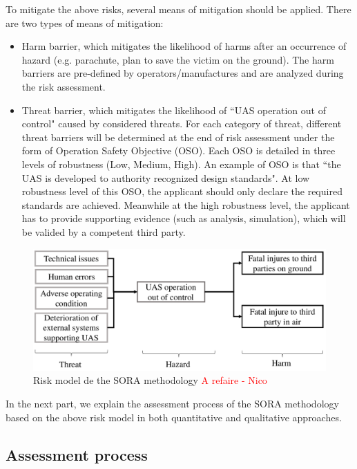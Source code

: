 \documentclass[a4paper, 10, conference]{ieeeconf}  %
\begin{document}
 To mitigate the above risks, several means of mitigation should be applied. There are two types of means of mitigation: 
\begin{itemize}
	\item Harm barrier, which mitigates the likelihood of harms after an occurrence of hazard (e.g. parachute, plan to save the victim on the ground). The harm barriers are pre-defined by operators/manufactures and are analyzed during the risk assessment. 
	\item Threat barrier, which mitigates the likelihood of ``UAS operation out of control" caused by considered threats. For each category of threat, different threat barriers will be determined at the end of risk assessment under the form of Operation Safety Objective (OSO). Each OSO is detailed in three levels of robustness (Low, Medium, High). An example of OSO is that ``the UAS is developed to authority recognized design standards"\cite{Annex_E_SORA}. At low robustness level  of this OSO, the applicant should only declare the required standards are achieved. Meanwhile at the high robustness level, the applicant has to provide supporting evidence (such as analysis, simulation), which will be valided by a competent third party.  
\end{itemize}

\begin{figure}[!ht]
	\centering
	\includegraphics[width=3.3 in]{image/Bow-tie_model.pdf}
	\caption{Risk model de the SORA methodology \textcolor{red}{A refaire - Nico}}
	\label{table: riskscenario}
\end{figure}  

 In the next part, we explain the assessment process of the SORA methodology based on the above risk model in both quantitative and qualitative approaches.

\subsection{Assessment process}
\end{document}
